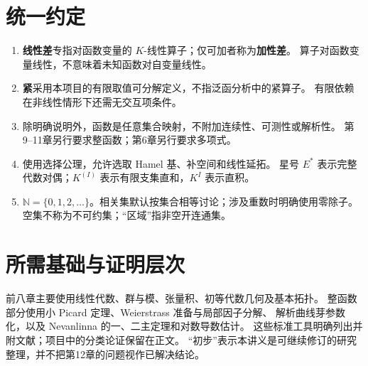 \documentclass[11pt,a4paper,oneside,openany]{book}
\theoremstyle{lecture}
\newcommand{\N}{\mathbb N}
\numberwithin{equation}{section}
\begin{document}
\section*{统一约定}
\begin{enumerate}
\item \textbf{线性差}专指对函数变量的 $K$-线性算子；仅可加者称为\textbf{加性差}。
算子对函数变量线性，不意味着未知函数对自变量线性。
\item \textbf{紧}采用本项目的有限取值可分解定义，不指泛函分析中的紧算子。
有限依赖在非线性情形下还需无交互项条件。
\item 除明确说明外，函数是任意集合映射，不附加连续性、可测性或解析性。
第9--11章另行要求整函数；第6章另行要求多项式。
\item 使用选择公理，允许选取 Hamel 基、补空间和线性延拓。
星号 $E^*$ 表示完整代数对偶；$K^{(I)}$ 表示有限支集直和，$K^I$ 表示直积。
\item $\N=\{0,1,2,\ldots\}$。相关集默认按集合相等讨论；涉及重数时明确使用零除子。
空集不称为不可约集；“区域”指非空开连通集。
\end{enumerate}

\section*{所需基础与证明层次}
前八章主要使用线性代数、群与模、张量积、初等代数几何及基本拓扑。
整函数部分使用小 Picard 定理、Weierstrass 准备与局部因子分解、
解析曲线芽参数化，以及 Nevanlinna 的一、二主定理和对数导数估计。
这些标准工具明确列出并附文献；项目中的分类论证保留在正文。
“初步”表示本讲义是可继续修订的研究整理，并不把第12章的问题视作已解决结论。

\clearpage
\begingroup\small\setlength{\parskip}{0pt}\tableofcontents\endgroup
\clearpage
\end{document}
